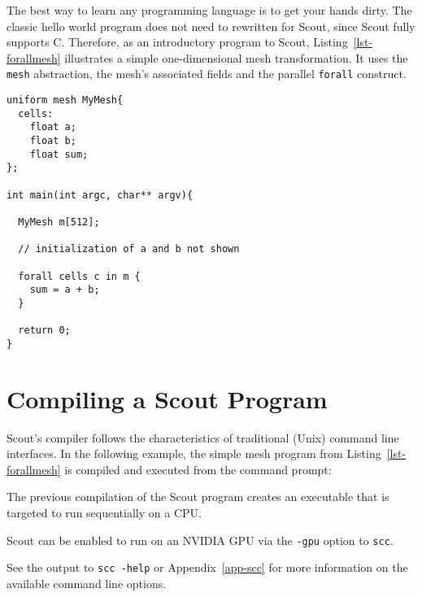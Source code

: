 The best way to learn any programming language is to get your hands dirty.  The classic
{hello world} program does not need to rewritten for Scout, since Scout fully supports
C.  Therefore, as an introductory program to Scout, Listing~\ref{lst-forallmesh}  
illustrates a simple one-dimensional mesh transformation.  It uses the \texttt{mesh}
abstraction, the mesh's associated fields and the parallel \texttt{forall} construct.

\par\bigskip
\begin{lstlisting}[label=lst-forallmesh,caption={Simple mesh example.}]
uniform mesh MyMesh{
  cells:
    float a;
    float b;
    float sum;
};

int main(int argc, char** argv){

  MyMesh m[512];

  // initialization of a and b not shown

  forall cells c in m {
    sum = a + b;
  }

  return 0;
}
\end{lstlisting}
\par\bigskip\noindent

\section{Compiling a Scout Program}
\label{ch1:compiling}

Scout's compiler follows the characteristics of traditional (Unix) command line interfaces.  In 
the following example, the simple mesh program from Listing~\ref{lst-forallmesh} is compiled and 
executed from the command prompt:

\par\bigskip
{}
\par\bigskip\noindent

The previous compilation of the Scout program creates an executable that is targeted to run
sequentially on a CPU.  


Scout can be enabled to run on an NVIDIA GPU via the \texttt{-gpu} option to \texttt{scc}.


See the output to \texttt{scc -help} or Appendix~\ref{app-scc} for more information on the
available command line options.
